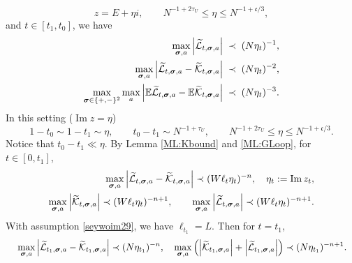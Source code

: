 \documentclass[10pt,reqno]{article}
\DeclareMathOperator{\im}{{\mathrm{Im}}}
\theoremstyle{plain} %
\theoremstyle{remark}
\numberwithin{equation}{section}
\begin{document}
$$
z=E+\eta i, \quad \quad  N^{-1+2\tau_U }\le \eta\le N^{-1+\mathfrak c/3}, 
$$
and $t\in [t_1,t_0]$, we have 
\begin{align} \label{WLKNE1}
\max_{\boldsymbol{\sigma}, \textbf{a}}\left|{\cal \widetilde{L}}_{t , \boldsymbol{\sigma}, \textbf{a}} \right|&\;\prec\; (N\eta_{t })^{-1}, 
\\ \label{WLKNE2}
\max_{\boldsymbol{\sigma}, \textbf{a}}\left|{\cal \widetilde{L}}_{t , \boldsymbol{\sigma}, \textbf{a}}-{\cal \widetilde{K}}_{t , \boldsymbol{\sigma}, \textbf{a}}\right|&\;\prec\; (N\eta_{t })^{-2}, 
\\ \label{WLKNE3}
\max_{\boldsymbol{\sigma}\in\{+,-\}^2}\max_{\textbf{a}}\left|\mathbb E {\cal \widetilde{L}}_{t , \boldsymbol{\sigma}, \textbf{a}}-\mathbb E{\cal \widetilde{K}}_{t , \boldsymbol{\sigma}, \textbf{a}}\right|&\;\prec\; (N\eta_{t })^{-3}.
\end{align} 
In this setting ($\im z= \eta$) 
\begin{equation}\label{seywoim29}
     1-t_0\sim 1-t_1\sim \eta,\quad \quad   t_0-t_1\sim N^{-1+ \tau_U},\quad\quad N^{-1+2\tau_U }\le \eta\le N^{-1+\mathfrak c/3}.
\end{equation}
 Notice that $t_0-t_1 \ll \eta$. By Lemma \ref{ML:Kbound} and \ref{ML:GLoop}, for $t\in [0,t_1]$, 
\begin{align}
 \max_{\boldsymbol{\sigma}, \textbf{a}}\left|{\cal \widetilde{L}}_{t, \boldsymbol{\sigma}, \textbf{a}}-{\cal \widetilde{K}}_{t, \boldsymbol{\sigma}, \textbf{a}}\right|\prec (W\ell_t\eta_t)^{-n},\quad \eta_t:=\im z_t,  %
\\\nonumber
\max_{\boldsymbol{\sigma}, \textbf{a}}\left|{\cal \widetilde{K}}_{t, \boldsymbol{\sigma}, \textbf{a}} \right| \prec (W\ell_t\eta_t)^{-n+1},\quad \quad \max_{\boldsymbol{\sigma}, \textbf{a}}\left|{\cal \widetilde{L}}_{t, \boldsymbol{\sigma}, \textbf{a}} \right|\prec (W\ell_t\eta_t)^{-n+1}. %
\end{align} 
With assumption \eqref{seywoim29},  we have $\ell_{t_1}=L$.  
Then for $t=t_1$,
\begin{align}\label{uwi2oo1}
\quad & \max_{\boldsymbol{\sigma}, \textbf{a}}\left|{\cal \widetilde{L}}_{t_1, \boldsymbol{\sigma}, \textbf{a}}-{\cal \widetilde{K}}_{t_1, \boldsymbol{\sigma}, \textbf{a}}\right|\prec (N\eta_{t_1})^{-n}, 
\quad \max_{\boldsymbol{\sigma}, \textbf{a}}\left(\left|{\cal \widetilde{K}}_{t_1, \boldsymbol{\sigma}, \textbf{a}} \right| +\left|{\cal \widetilde{L}}_{t_1, \boldsymbol{\sigma}, \textbf{a}} \right|\right)\prec (N\eta_{t_1})^{-n+1}.  \end{align} 
\end{document}
